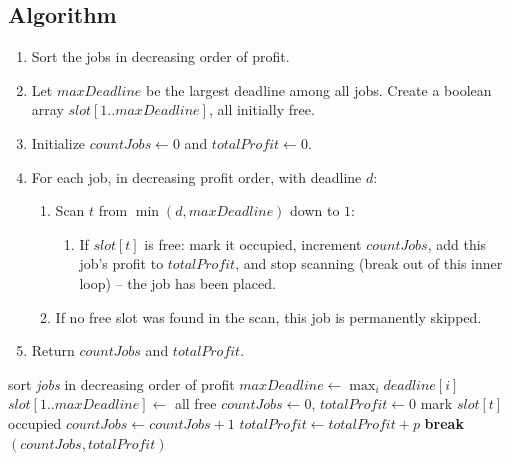 \subsection*{Algorithm}

\begin{enumerate}
  \item Sort the jobs in decreasing order of profit.
  \item Let $\textit{maxDeadline}$ be the largest deadline among all jobs.
        Create a boolean array $\textit{slot}[1..\textit{maxDeadline}]$,
        all initially free.
  \item Initialize $\textit{countJobs} \gets 0$ and
        $\textit{totalProfit} \gets 0$.
  \item For each job, in decreasing profit order, with deadline $d$:
  \begin{enumerate}
    \item Scan $t$ from $\min(d, \textit{maxDeadline})$ down to $1$:
    \begin{enumerate}
      \item If $\textit{slot}[t]$ is free: mark it occupied, increment
            $\textit{countJobs}$, add this job's profit to
            $\textit{totalProfit}$, and stop scanning (break out of this
            inner loop) -- the job has been placed.
    \end{enumerate}
    \item If no free slot was found in the scan, this job is permanently
          skipped.
  \end{enumerate}
  \item Return $\textit{countJobs}$ and $\textit{totalProfit}$.
\end{enumerate}

\begin{algorithm}[H]
\caption{Job Sequencing}
\begin{algorithmic}[1]
  \State sort \textit{jobs} in decreasing order of profit
  \State $\textit{maxDeadline} \gets \max_i \textit{deadline}[i]$
  \State $\textit{slot}[1..\textit{maxDeadline}] \gets$ all free
  \State $\textit{countJobs} \gets 0$, $\textit{totalProfit} \gets 0$
        \State mark $\textit{slot}[t]$ occupied
        \State $\textit{countJobs} \gets \textit{countJobs} + 1$
        \State $\textit{totalProfit} \gets \textit{totalProfit} + p$
        \State \textbf{break}
      \EndIf
    \EndFor
  \EndFor
  \State \Return $(\textit{countJobs}, \textit{totalProfit})$
\EndProcedure
\end{algorithmic}
\end{algorithm}

